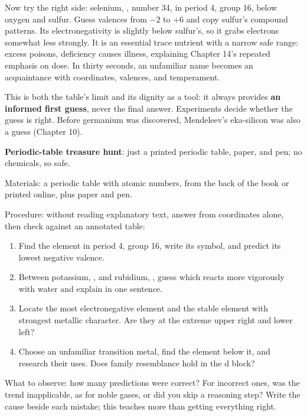 Now try the right side: selenium, , number 34, in period 4, group 16, below oxygen and sulfur. Guess valences from $-2$ to $+6$ and copy sulfur's compound patterns. Its electronegativity is slightly below sulfur's, so it grabs electrons somewhat less strongly. It is an essential trace nutrient with a narrow safe range: excess poisons, deficiency causes illness, explaining Chapter 14's repeated emphasis on dose. In thirty seconds, an unfamiliar name becomes an acquaintance with coordinates, valences, and temperament.

This is both the table's limit and its dignity as a tool: it always provides \textbf{an informed first guess}, never the final answer. Experiments decide whether the guess is right. Before germanium was discovered, Mendeleev's eka-silicon was also a guess (Chapter 10).

\begin{shiyan}
\textbf{Periodic-table treasure hunt}: just a printed periodic table, paper, and pen; no chemicals, so safe.

Materials: a periodic table with atomic numbers, from the back of the book or printed online, plus paper and pen.

Procedure: without reading explanatory text, answer from coordinates alone, then check against an annotated table:
\begin{enumerate}[itemsep=1pt]
\item Find the element in period 4, group 16, write its symbol, and predict its lowest negative valence.
\item Between potassium, , and rubidium, , guess which reacts more vigorously with water and explain in one sentence.
\item Locate the most electronegative element and the stable element with strongest metallic character. Are they at the extreme upper right and lower left?
\item Choose an unfamiliar transition metal, find the element below it, and research their uses. Does family resemblance hold in the d block?
\end{enumerate}

What to observe: how many predictions were correct? For incorrect ones, was the trend inapplicable, as for noble gases, or did you skip a reasoning step? Write the cause beside each mistake; this teaches more than getting everything right.
\end{shiyan}


